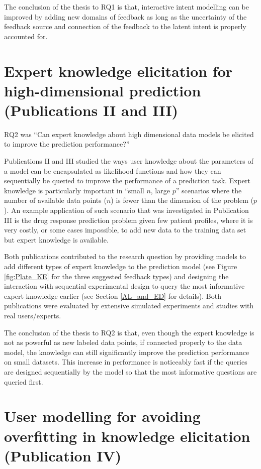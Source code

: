 \documentclass[dissertation,math,vertlayout,pdfa,colorlinks]{aaltoseries}
\begin{document}
The conclusion of the thesis to RQ1 is that, interactive intent modelling can be improved by adding new domains of feedback as long as the uncertainty of the feedback source and connection of the feedback to the latent intent is properly accounted for.  

\section{Expert knowledge elicitation for high-dimensional prediction (Publications II and III)}

RQ2 was ``Can expert knowledge about high dimensional data models be elicited to improve the prediction performance?''

Publications II and III studied the ways user knowledge about the parameters of a model can be encapsulated as likelihood functions and how they can sequentially be queried to improve the performance of a prediction task. Expert knowledge is particularly important in ``small $n$, large $p$'' scenarios where the number of available data points ($n$) is fewer than the dimension of the problem ($p$). An example application of such scenario that was investigated in Publication III is the drug response prediction problem given few patient profiles, where it is very costly, or some cases impossible, to add new data to the training data set but expert knowledge is available. 

Both publications contributed to the research question by providing models to add different types of expert knowledge to the prediction model (see Figure \ref{fig:Plate_KE} for the three suggested feedback types) and designing the interaction with sequential experimental design to query the most informative expert knowledge earlier (see Section \ref{AL_and_ED} for details). Both publications were evaluated by extensive simulated experiments and studies with real users/experts.

The conclusion of the thesis to RQ2 is that, even though the expert knowledge is not as powerful as new labeled data points, if connected properly to the data model, the knowledge can still significantly improve the prediction performance on small datasets. This increase in performance is noticeably fast if the queries are designed sequentially by the model so that the most informative questions are queried first. 

\section{User modelling for avoiding overfitting in knowledge elicitation (Publication IV)}
\end{document}
